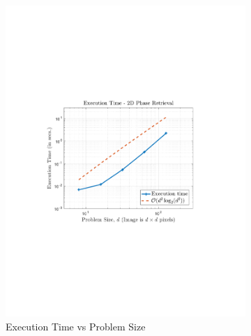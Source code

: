 \begin{figure}[hbtp]
    \centering
    \begin{subfigure}[b]{0.495\textwidth}
        \centering
        \includegraphics[clip=true, trim = 1.10in 3.25in 0.75in 3.25in,
scale=0.55]{etime}
        \caption{Execution Time vs Problem Size}
        \label{fig:etime}
    \end{subfigure}
    \hfill
    \begin{subfigure}[b]{0.495\textwidth}
        \centering

\end{subfigure}
\end{figure}
